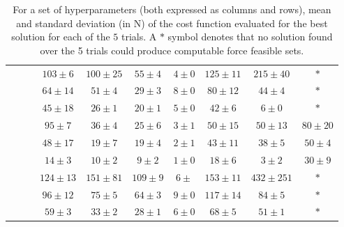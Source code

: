 \begin{table}[!ht]
\begin{tabular}{|c|c|c|c|c|c|c|c|c|c|}
    &  
      &  &  $103\pm 6$ & $100\pm 25$ & $55\pm 4$ & $4\pm 0$ & $125\pm 11$ & $215\pm 40$ & $*$ \\  
    & &  & $64\pm 14$ & $51\pm 4$ & $29\pm 3$ & $8\pm 0$ & $80\pm 12$ & $44\pm 4$ & $*$ \\  
    & &  &  $45\pm 18$ & $26\pm 1$ & $20\pm 1$ & $5\pm 0$ & $42\pm 6$ & $6\pm 0$ & $*$ \\ 
    \hline
    \hline
     &  
      &  &  $95\pm 7$ & $36\pm 4$ & $25\pm 6$ & $3\pm 1$ & $50\pm 15$ & $50\pm 13$ & $80\pm 20$ \\  
    & &  & $48\pm 17$ & $19\pm 7$ & $19\pm 4$ & $2\pm 1$ & $43\pm 11$ & $38\pm 5$ & $50\pm 4$ \\  
    & &  &  $14\pm 3$ & $10\pm 2$ & $9\pm 2$ & $1\pm 0$ & $18\pm 6$ & $3\pm 2$ & $30\pm 9$ \\ 

    
    &  
      &  &  $124\pm 13$ & $151\pm 81$ & $109\pm 9$ & $6\pm $ & $153\pm 11$ & $432\pm 251$ & $*$ \\  
    & &  & $96\pm 12$ & $75\pm 5$ & $64\pm 3$ & $9\pm 0$ & $117\pm 14$ & $84\pm 5$ & $*$ \\  
    & &  &  $59\pm 3$ & $33\pm 2$ & $28\pm 1$ & $6\pm 0$ & $68\pm 5$ & $51\pm 1$ & $*$ \\ 
    \hline
    
    \end{tabular}
    \caption{For a set of hyperparameters (both expressed as columns and rows), mean and standard deviation (in N) of the cost function evaluated for the best solution for each of the $5$ trials. A $*$ symbol denotes that no solution found over the 5 trials could produce computable force feasible sets.}
    \label{tab:accuracy_fitting_ell_MEAN_COST_FCT_OVER_ALL_SOLUTIONS}
\end{table}
\egroup

